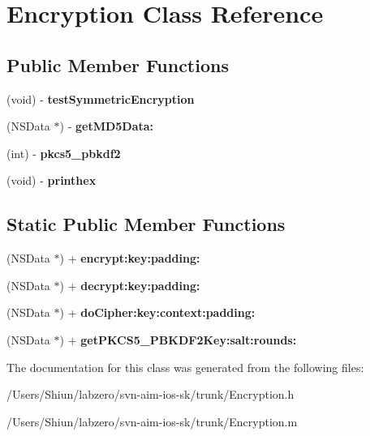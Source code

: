 \hypertarget{interface_encryption}{
\section{Encryption Class Reference}
\label{interface_encryption}
}
\subsection*{Public Member Functions}
\begin{DoxyCompactItemize}
\item 
\hypertarget{interface_encryption_aa8e856a8dade1ab78d4c8a8524138bf3}{
(void) -\/ {\bfseries testSymmetricEncryption}}
\label{interface_encryption_aa8e856a8dade1ab78d4c8a8524138bf3}

\item 
\hypertarget{interface_encryption_a275d22449225f86c1932660e2a7f3783}{
(NSData $\ast$) -\/ {\bfseries getMD5Data:}}
\label{interface_encryption_a275d22449225f86c1932660e2a7f3783}

\item 
\hypertarget{interface_encryption_a1bdf2cb9f03dfcc5263ef8975b9b431e}{
(int) -\/ {\bfseries pkcs5\_\-pbkdf2}}
\label{interface_encryption_a1bdf2cb9f03dfcc5263ef8975b9b431e}

\item 
\hypertarget{interface_encryption_a9cc32d3662f60303b6af0ee6944beaee}{
(void) -\/ {\bfseries printhex}}
\label{interface_encryption_a9cc32d3662f60303b6af0ee6944beaee}

\end{DoxyCompactItemize}
\subsection*{Static Public Member Functions}
\begin{DoxyCompactItemize}
\item 
\hypertarget{interface_encryption_ac84292f9cd206a723f5ad42a99a385e3}{
(NSData $\ast$) + {\bfseries encrypt:key:padding:}}
\label{interface_encryption_ac84292f9cd206a723f5ad42a99a385e3}

\item 
\hypertarget{interface_encryption_a29f36b4010c07cb282187ba11e0e3925}{
(NSData $\ast$) + {\bfseries decrypt:key:padding:}}
\label{interface_encryption_a29f36b4010c07cb282187ba11e0e3925}

\item 
\hypertarget{interface_encryption_a7f96418c83d890433dab1d4d6abb2650}{
(NSData $\ast$) + {\bfseries doCipher:key:context:padding:}}
\label{interface_encryption_a7f96418c83d890433dab1d4d6abb2650}

\item 
\hypertarget{interface_encryption_abab03d25cbe9e504cc3ca8b6d204a2f4}{
(NSData $\ast$) + {\bfseries getPKCS5\_\-PBKDF2Key:salt:rounds:}}
\label{interface_encryption_abab03d25cbe9e504cc3ca8b6d204a2f4}

\end{DoxyCompactItemize}


The documentation for this class was generated from the following files:\begin{DoxyCompactItemize}
\item 
/Users/Shiun/labzero/svn-\/aim-\/ios-\/sk/trunk/Encryption.h\item 
/Users/Shiun/labzero/svn-\/aim-\/ios-\/sk/trunk/Encryption.m\end{DoxyCompactItemize}
